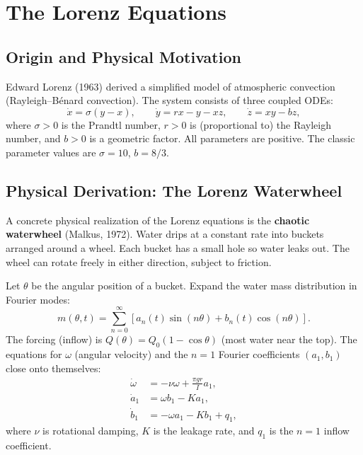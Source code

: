 \documentclass[11pt,letterpaper]{article}
\theoremstyle{definition}
\theoremstyle{plain}
\theoremstyle{remark}
\begin{document}
\section{The Lorenz Equations}\label{sec:lorenz}

\subsection{Origin and Physical Motivation}

Edward Lorenz (1963) derived a simplified model of atmospheric convection
(Rayleigh--B\'enard convection).  The system consists of three coupled ODEs:
\begin{equation}\label{eq:lorenz}
\boxed{
  \dot{x} = \sigma(y-x), \qquad
  \dot{y} = rx - y - xz, \qquad
  \dot{z} = xy - bz,
}
\end{equation}
where $\sigma > 0$ is the Prandtl number, $r > 0$ is (proportional to) the
Rayleigh number, and $b > 0$ is a geometric factor.  All parameters are
positive.  The classic parameter values are $\sigma = 10$, $b = 8/3$.

\subsection{Physical Derivation: The Lorenz Waterwheel}

A concrete physical realization of the Lorenz equations is the
\textbf{chaotic waterwheel} (Malkus, 1972).  Water drips at a constant
rate into buckets arranged around a wheel.  Each bucket has a small
hole so water leaks out.  The wheel can rotate freely in either
direction, subject to friction.

Let $\theta$ be the angular position of a bucket.  Expand the water
mass distribution in Fourier modes:
\[
  m(\theta,t) = \sum_{n=0}^{\infty}[a_n(t)\sin(n\theta)
  + b_n(t)\cos(n\theta)].
\]
The forcing (inflow) is $Q(\theta)=Q_0(1-\cos\theta)$ (most water
near the top).  The equations for $\omega$ (angular velocity) and the
$n=1$ Fourier coefficients $(a_1,b_1)$ close onto themselves:
\begin{align}
  \dot{\omega} &= -\nu\omega + \frac{\pi g r}{I}a_1, \\
  \dot{a}_1 &= \omega b_1 - Ka_1, \\
  \dot{b}_1 &= -\omega a_1 - Kb_1 + q_1,
\end{align}
where $\nu$ is rotational damping, $K$ is the leakage rate, and $q_1$
is the $n=1$ inflow coefficient.
\end{document}
